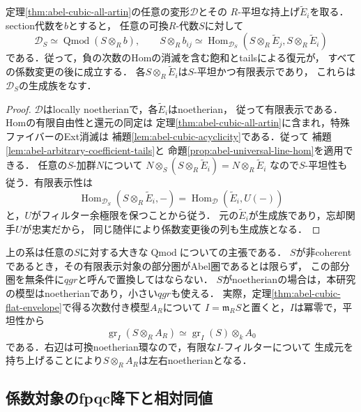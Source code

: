 \begin{corollary}[可換三次点の全Artin変形の普遍飽和]
\label{cor:abel-universal-artin-model}
定理\ref{thm:abel-cubic-all-artin}の任意の変形$\mathcal D$とその
$R$-平坦な持上げ$\widetilde E_i$を取る．section代数を$b$とすると，
任意の可換$R$-代数$S$に対して
\[
 \mathcal D_S\simeq\operatorname{Qmod}(S\otimes_R b),\qquad
 S\otimes_R b_{ij}\simeq
 \operatorname{Hom}_{\mathcal D_S}
 (S\otimes_R\widetilde E_j,S\otimes_R\widetilde E_i)
\]
である．従って，負の次数のHomの消滅を含む飽和とtailsによる復元が，
すべての係数変更の後に成立する．
各$S\otimes_R\widetilde E_i$は$S$-平坦かつ有限表示であり，
これらは$\mathcal D_S$の生成族をなす．
\end{corollary}
\begin{proof}
$\mathcal D$はlocally noetherianで，各$\widetilde E_i$はnoetherian，
従って有限表示である．Homの有限自由性と還元の同定は
定理\ref{thm:abel-cubic-all-artin}に含まれ，特殊ファイバーのExt消滅は
補題\ref{lem:abel-cubic-acyclicity}である．従って
補題\ref{lem:abel-arbitrary-coefficient-tails}と
命題\ref{prop:abel-universal-line-hom}を適用できる．
任意の$S$-加群$N$について
$N\otimes_S(S\otimes_R\widetilde E_i)=N\otimes_R\widetilde E_i$
なので$S$-平坦性も従う．有限表示性は
\[
 \operatorname{Hom}_{\mathcal D_S}(S\otimes_R\widetilde E_i,-)
 =\operatorname{Hom}_{\mathcal D}(\widetilde E_i,U(-))
\]
と，$U$がフィルター余極限を保つことから従う．
元の$\widetilde E_i$が生成族であり，忘却関手$U$が忠実だから，
同じ随伴により係数変更後の列も生成族となる．
\end{proof}

\begin{remark}[任意の底における小さい圏の扱い]
上の系は任意の$S$に対する大きな$\operatorname{Qmod}$についての主張である．
$S$が非coherentであるとき，その有限表示対象の部分圏がAbel圏であるとは限らず，
この部分圏を無条件に$qgr$と呼んで置換してはならない．
$S$がnoetherianの場合は，本研究の模型はnoetherianであり，小さい$qgr$も使える．
実際，定理\ref{thm:abel-cubic-flat-envelope}で得る次数付き模型$A_R$について
$I=\mathfrak m_R S$と置くと，$I$は冪零で，平坦性から
\[
 \operatorname{gr}_I(S\otimes_R A_R)
 \simeq\operatorname{gr}_I(S)\otimes_k A_0
\]
である．右辺は可換noetherian環なので，有限な$I$-フィルターについて
生成元を持ち上げることにより$S\otimes_R A_R$は左右noetherianとなる．
\end{remark}

\subsection{係数対象のfpqc降下と相対同値}
\label{subsec:abel-coefficient-descent}

